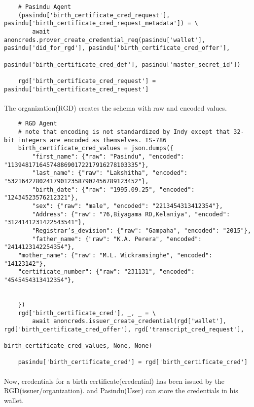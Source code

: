 \begin{verbatim}
    # Pasindu Agent
    (pasindu['birth_certificate_cred_request'], pasindu['birth_certificate_cred_request_metadata']) = \
        await anoncreds.prover_create_credential_req(pasindu['wallet'], pasindu['did_for_rgd'], pasindu['birth_certificate_cred_offer'],
                                                     pasindu['birth_certificate_cred_def'], pasindu['master_secret_id'])
                                                     
    rgd['birth_certificate_cred_request'] = pasindu['birth_certificate_cred_request']

\end{verbatim}

\paragraph{}
The organization(RGD) creates the schema with raw and encoded values.

\begin{verbatim}
    # RGD Agent
    # note that encoding is not standardized by Indy except that 32-bit integers are encoded as themselves. IS-786
    birth_certificate_cred_values = json.dumps({
        "first_name": {"raw": "Pasindu", "encoded": "1139481716457488690172217916278103335"},
        "last_name": {"raw": "Lakshitha", "encoded": "5321642780241790123587902456789123452"},
        "birth_date": {"raw": "1995.09.25", "encoded": "12434523576212321"},
        "sex": {"raw": "male", "encoded": "2213454313412354"},
        "Address": {"raw": "76,Biyagama RD,Kelaniya", "encoded": "3124141231422543541"},
        "Registrar’s_devision": {"raw": "Gampaha", "encoded": "2015"},
        "father_name": {"raw": "K.A. Perera", "encoded": "2414123142254354"},
    "mother_name": {"raw": "M.L. Wickramsinghe", "encoded": "14123142"},
    "certificate_number": {"raw": "231131", "encoded": "4545454313412354"},


    })
    rgd['birth_certificate_cred'], _, _ = \
        await anoncreds.issuer_create_credential(rgd['wallet'], rgd['birth_certificate_cred_offer'], rgd['transcript_cred_request'],
                                                birth_certificate_cred_values, None, None)
                                                
    pasindu['birth_certificate_cred'] = rgd['birth_certificate_cred']
\end{verbatim}

\paragraph{}
Now, credentials for a birth certificate(credential) has been issued by the RGD(issuer/organization). and Pasindu(User) can store the credentials in his wallet.

